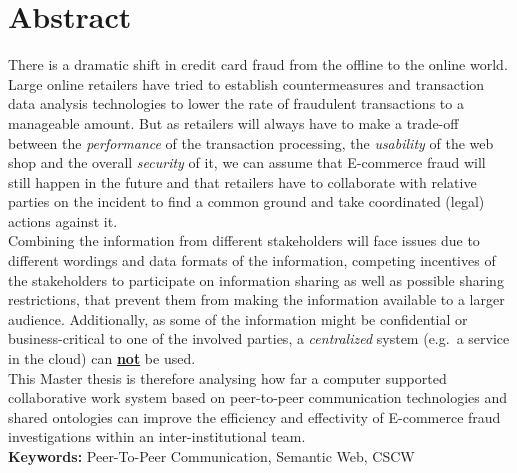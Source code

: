 
\chapter*{Abstract}

There is a dramatic shift in credit card fraud from the offline to the online world. Large online retailers have tried to establish countermeasures and transaction data analysis technologies to lower the rate of fraudulent transactions to a manageable amount. But as retailers will always have to make a trade-off between the \textit{performance} of the transaction processing, the \textit{usability} of the web shop and the overall \textit{security} of it, we can assume that E-commerce fraud will still happen in the future and that retailers have to collaborate with relative parties on the incident to find a common ground and take coordinated (legal) actions against it. \\

Combining the information from different stakeholders will face issues due to different wordings and data formats of the information, competing incentives of the stakeholders to participate on information sharing as well as possible sharing restrictions, that prevent them from making the information available to a larger audience. Additionally, as some of the information might be confidential or business-critical to one of the involved parties, a \textit{centralized} system (e.g.\ a service in the cloud) can \textbf{\underline{not}} be used. \\

This Master thesis is therefore analysing how far a computer supported collaborative work system based on peer-to-peer communication technologies and shared ontologies can improve the efficiency and effectivity of E-commerce fraud investigations within an inter-institutional team. \\[2em]

\textbf{Keywords:} Peer-To-Peer Communication, Semantic Web, CSCW
